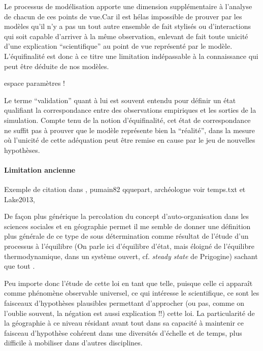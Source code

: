 Le processus de modélisation apporte une dimension supplémentaire à l'analyse de chacun de ces points de vue.Car il est hélas impossible de prouver par les modèles qu'il n'y a pas un tout autre ensemble de fait stylisés ou d'interactions qui soit capable d'arriver à la même observation, enlevant de fait toute unicité d’une explication \enquote{scientifique} au point de vue représenté par le modèle. L'équifinalité est donc à ce titre une limitation indépassable à la connaissance qui peut être déduite de nos modèles.

espace paramètres !

Le terme \enquote{validation} quant à lui est souvent entendu pour définir un état qualifiant la correspondance entre des observations empiriques et les sorties de la simulation. Compte tenu de la notion d'équifinalité, cet état de correspondance ne suffit pas à prouver que le modèle représente bien la \enquote{réalité}, dans la mesure où l’unicité de cette adéquation peut être remise en cause par le jeu de nouvelles hypothèses. 

\paragraph{Limitation ancienne}
Exemple de citation dans \textcite[192]{Sheps1971}, pumain82 qquepart, archéologue voir temps.txt et Lake2013, 

De façon plus générique la percolation du concept d'auto-organisation dans les sciences sociales et en géographie permet il me semble de donner une définition plus générale de ce type de sous détermination comme résultat de l'étude d'un processus à l'équilibre (On parle ici d'équilibre d'état, mais éloigné de l'équilibre thermodynamique, dans un système ouvert, cf. \textit{steady state} de Prigogine) sachant que tout . 

Peu importe donc l'étude de cette loi en tant que telle, puisque celle ci apparaît comme phénomène observable universel, ce qui intéresse le scientifique, ce sont les faisceaux d'hypothèses plausibles permettant d'approcher (ou pas, comme on l'oublie souvent, la négation est aussi explication !!) cette loi. La particularité de la géographie à ce niveau résidant avant tout dans sa capacité à maintenir ce faisceau d'hypothèse cohérent dans une diversités d'échelle et de temps, plus difficile à mobiliser dans d'autres disciplines.

